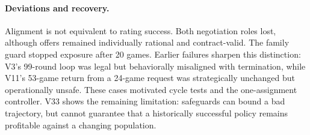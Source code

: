 \paragraph{Deviations and recovery.}
Alignment is not equivalent to rating success. Both negotiation roles lost,
although offers remained individually rational and contract-valid. The family
guard stopped exposure after 20 games. Earlier failures sharpen this
distinction: V3's 99-round loop was legal but behaviorally misaligned with
termination, while V11's 53-game return from a 24-game request was strategically
unchanged but operationally unsafe. These cases motivated cycle tests and the
one-assignment controller. V33 shows the remaining limitation: safeguards can
bound a bad trajectory, but cannot guarantee that a historically successful
policy remains profitable against a changing population.
